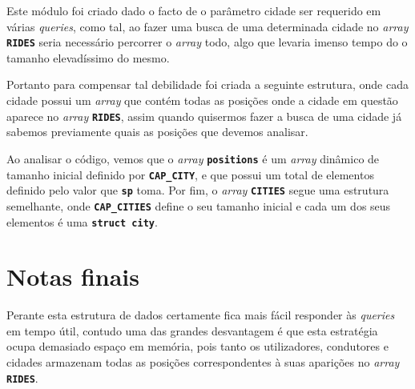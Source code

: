 \documentclass[12pt,a4paper]{report}
\begin{document}
Este módulo foi criado dado o facto de o parâmetro cidade ser requerido em várias \textit{queries}, como tal, ao fazer uma busca de uma determinada cidade no \textit{array} \textbf{\small\texttt{RIDES}} seria necessário percorrer o \textit{array} todo, algo que levaria imenso tempo do o tamanho elevadíssimo do mesmo.

Portanto para compensar tal debilidade foi criada a seguinte estrutura, onde cada cidade possui um \textit{array} que contém todas as posições onde a cidade em questão aparece no \textit{array} \textbf{\small\texttt{RIDES}}, assim quando quisermos fazer a busca de uma cidade já sabemos previamente quais as posições que devemos analisar.



Ao analisar o código, vemos que o \textit{array} \textbf{\small\texttt{positions}} é um \textit{array} dinâmico de tamanho inicial definido por \textbf{\small\texttt{CAP\_CITY}}, e que possui um total de elementos definido pelo valor que \textbf{\small\texttt{sp}} toma. Por fim, o \textit{array} \textbf{\small\texttt{CITIES}}  segue uma estrutura semelhante, onde \textbf{\small\texttt{CAP\_CITIES}} define o seu tamanho inicial e cada um dos seus elementos é uma \textbf{\small\texttt{struct city}}.

\section{Notas finais}

Perante esta estrutura de dados certamente fica mais fácil responder às \textit{queries} em tempo útil, contudo uma das grandes desvantagem é que esta estratégia ocupa demasiado espaço em memória, pois tanto os utilizadores, condutores e cidades armazenam todas as posições correspondentes à suas aparições no \textit{array} \textbf{\small\texttt{RIDES}}.
\end{document}
